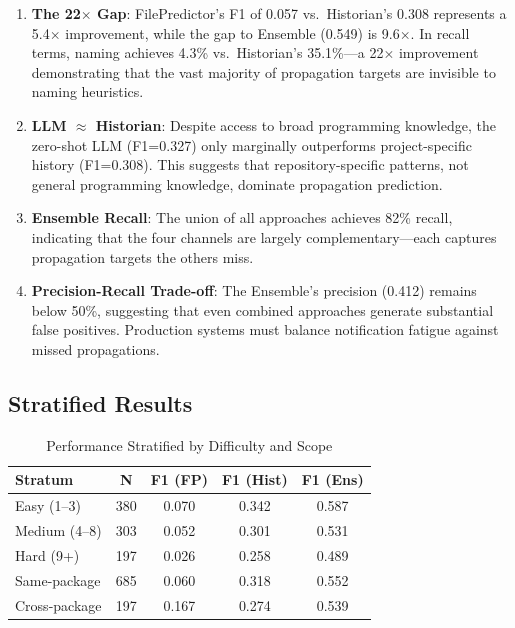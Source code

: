 \documentclass[sigconf,nonacm]{acmart}
\begin{document}
\begin{enumerate}
    \item \textbf{The 22$\times$ Gap}: FilePredictor's F1 of 0.057 vs.\ Historian's 0.308 represents a 5.4$\times$ improvement, while the gap to Ensemble (0.549) is 9.6$\times$. In recall terms, naming achieves 4.3\% vs.\ Historian's 35.1\%---a 22$\times$ improvement demonstrating that the vast majority of propagation targets are invisible to naming heuristics.
    
    \item \textbf{LLM $\approx$ Historian}: Despite access to broad programming knowledge, the zero-shot LLM (F1=0.327) only marginally outperforms project-specific history (F1=0.308). This suggests that repository-specific patterns, not general programming knowledge, dominate propagation prediction.
    
    \item \textbf{Ensemble Recall}: The union of all approaches achieves 82\% recall, indicating that the four channels are largely complementary---each captures propagation targets the others miss.
    
    \item \textbf{Precision-Recall Trade-off}: The Ensemble's precision (0.412) remains below 50\%, suggesting that even combined approaches generate substantial false positives. Production systems must balance notification fatigue against missed propagations.
\end{enumerate}

\subsection{Stratified Results}

\begin{table}[h]
\caption{Performance Stratified by Difficulty and Scope}
\label{tab:stratified}
\begin{tabular}{lcccc}
\toprule
\textbf{Stratum} & \textbf{N} & \textbf{F1 (FP)} & \textbf{F1 (Hist)} & \textbf{F1 (Ens)} \\
\midrule
Easy (1--3) & 380 & 0.070 & 0.342 & 0.587 \\
Medium (4--8) & 303 & 0.052 & 0.301 & 0.531 \\
Hard (9+) & 197 & 0.026 & 0.258 & 0.489 \\
\midrule
Same-package & 685 & 0.060 & 0.318 & 0.552 \\
Cross-package & 197 & 0.167 & 0.274 & 0.539 \\
\bottomrule
\end{tabular}
\end{table}
\end{document}
